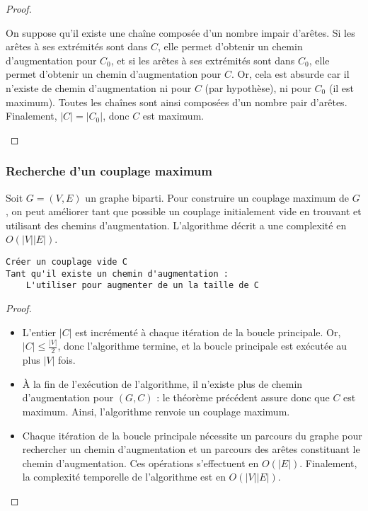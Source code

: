\documentclass[11pt,a4paper]{article}
\begin{document}
\begin{proof}
\begin{itemize}
      On suppose qu'il existe une chaîne composée d'un nombre impair d'arêtes. Si les arêtes à ses extrémités sont dans \(C\), elle permet d'obtenir un chemin d'augmentation pour \(C_0\), et si les arêtes à ses extrémités sont dans \(C_0\), elle permet d'obtenir un chemin d'augmentation pour \(C\). Or, cela est absurde car il n'existe de chemin d'augmentation ni pour \(C\) (par hypothèse), ni pour \(C_0\) (il est maximum). Toutes les chaînes sont ainsi composées d'un nombre pair d'arêtes. Finalement, \(|C|=|C_0|\), donc \(C\) est maximum.

  \end{itemize}
\end{proof}


      \subsubsection{Recherche d'un couplage maximum}
Soit \(G=(V,E)\) un graphe biparti. Pour construire un couplage maximum de \(G\), on peut améliorer tant que possible un couplage initialement vide en trouvant et utilisant des chemins d'augmentation. L'algorithme décrit a une complexité en \(O(|V||E|)\).

\begin{lstlisting}
Créer un couplage vide C
Tant qu'il existe un chemin d'augmentation :
    L'utiliser pour augmenter de un la taille de C
\end{lstlisting}

\begin{proof}\leavevmode
  \begin{itemize}
    \item L'entier \(|C|\) est incrémenté à chaque itération de la boucle principale. Or, \(|C| \leq \frac{|V|}{2}\), donc l'algorithme termine, et la boucle principale est exécutée au plus \(|V|\) fois.
    \item À la fin de l'exécution de l'algorithme, il n'existe plus de chemin d'augmentation pour \((G,C)\) : le théorème précédent assure donc que \(C\) est maximum. Ainsi, l'algorithme renvoie un couplage maximum.
    \item Chaque itération de la boucle principale nécessite un parcours du graphe pour rechercher un chemin d'augmentation et un parcours des arêtes constituant le chemin d'augmentation. Ces opérations s'effectuent en \(O(|E|)\). Finalement, la complexité temporelle de l'algorithme est en \(O(|V||E|)\).
  \end{itemize}
\end{proof}
\end{document}
